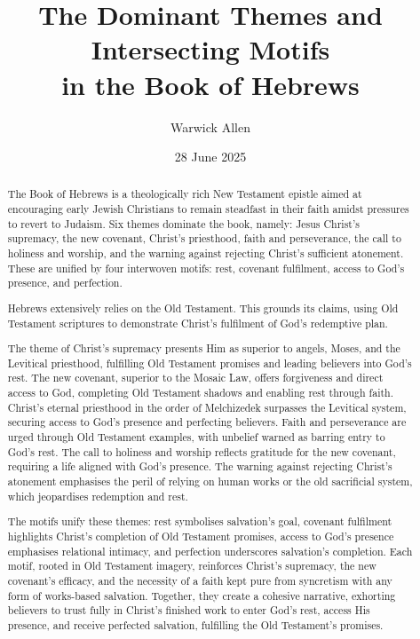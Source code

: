 \documentclass[12pt]{article}
\title{The Dominant Themes and Intersecting Motifs \\ in the Book of Hebrews}
\author{Warwick Allen}
\date{28 June 2025}
\def\jesus{Yeshua}
\def\christ{the Messiah}
\def\Christ{The Messiah}
\def\jesus{Jesus}
\def\christ{Christ}
\def\Christ{Christ}
\begin{document}
\maketitle

\begin{abstract}
The Book of Hebrews is a theologically rich New Testament epistle aimed at
encouraging early Jewish Christians to remain steadfast in their faith amidst
pressures to revert to Judaism.
%
Six themes dominate the book, namely: \jesus{} \christ{}’s supremacy, the new
covenant, \christ{}’s priesthood, faith and perseverance, the call to holiness
and worship, and the warning against rejecting \christ{}’s sufficient atonement.
%
These are unified by four interwoven motifs: rest, covenant fulfilment, access
to God’s presence, and perfection.

Hebrews extensively relies on the Old Testament.
%
This grounds its claims, using Old Testament scriptures to demonstrate
\christ{}’s fulfilment of God’s redemptive plan.

The theme of \christ{}’s supremacy presents Him as superior to angels, Moses,
and the Levitical priesthood, fulfilling Old Testament promises and leading
believers into God’s rest.
%
The new covenant, superior to the Mosaic Law, offers forgiveness and direct
access to God, completing Old Testament shadows and enabling rest through faith.
%
\Christ{}’s eternal priesthood in the order of Melchizedek surpasses the
Levitical system, securing access to God’s presence and perfecting believers.
%
Faith and perseverance are urged through Old Testament examples, with unbelief
warned as barring entry to God’s rest. The call to holiness and worship reflects
gratitude for the new covenant, requiring a life aligned with God’s presence.
%
The warning against rejecting \christ{}’s atonement emphasises the peril of
relying on human works or the old sacrificial system, which jeopardises
redemption and rest.

The motifs unify these themes: rest symbolises salvation’s goal, covenant
fulfilment highlights \christ{}’s completion of Old Testament promises, access
to God’s presence emphasises relational intimacy, and perfection underscores
salvation’s completion.
%
Each motif, rooted in Old Testament imagery, reinforces \christ{}’s supremacy,
the new covenant’s efficacy, and the necessity of a faith kept pure from
syncretism with any form of works-based salvation.
%
Together, they create a cohesive narrative, exhorting believers to trust fully
in \christ{}’s finished work to enter God’s rest, access His presence, and
receive perfected salvation, fulfilling the Old Testament’s promises.
\end{abstract}
\end{document}
